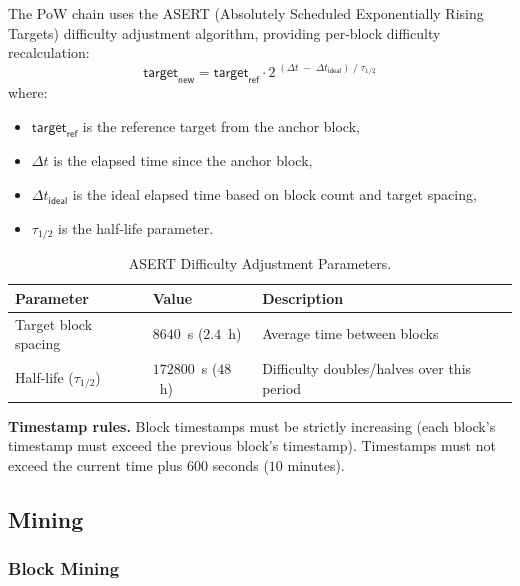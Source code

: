 The PoW chain uses the ASERT (Absolutely Scheduled Exponentially Rising Targets) difficulty adjustment algorithm, providing per-block difficulty recalculation:
\[
  \mathsf{target}_\mathsf{new} = \mathsf{target}_\mathsf{ref} \cdot 2^{\;(\Delta t \;-\; \Delta t_\mathsf{ideal}) \;/\; \tau_{1/2}}
\]
where:
\begin{itemize}[nosep]
  \item $\mathsf{target}_\mathsf{ref}$ is the reference target from the anchor block,
  \item $\Delta t$ is the elapsed time since the anchor block,
  \item $\Delta t_\mathsf{ideal}$ is the ideal elapsed time based on block count and target spacing,
  \item $\tau_{1/2}$ is the half-life parameter.
\end{itemize}

\begin{table}[!htbp]
  \begin{center}
    \caption{ASERT Difficulty Adjustment Parameters.}\label{ta:pow-difficulty}
    \begin{tabular}{|p{5cm}|p{4cm}|p{4.5cm}|}\hline
      Parameter & Value & Description \\\hline\hline
      Target block spacing & $8640$~s ($2.4$~h) & Average time between blocks \\\hline
      Half-life ($\tau_{1/2}$) & $172800$~s ($48$~h) & Difficulty doubles/halves over this period \\\hline
    \end{tabular}
  \end{center}
\end{table}

\textbf{Timestamp rules.} Block timestamps must be strictly increasing (each block's timestamp must exceed the previous block's timestamp). Timestamps must not exceed the current time plus $600$ seconds ($10$ minutes).


\subsection{Mining}\label{sec:pow-mining}

\subsubsection{Block Mining}\label{sec:pow-block-mining}

